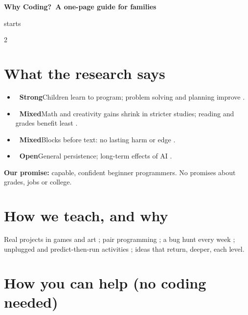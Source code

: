 \documentclass[level=1]{kidscode}
\newcommand{\evlabel}[3]{\textcolor{#1}{\textbf{#2\ #3}}}
\newcommand{\evS}{\evlabel{kcgreentext}{\faCheckCircle}{Strong}}
\newcommand{\evM}{\evlabel{kcorangetext}{\faAdjust}{Mixed}}
\newcommand{\evO}{\evlabel{kcpurpletext}{\faQuestionCircle}{Open}}
\begin{document}
\thispagestyle{fancy}
%
{\fontsize{24}{28}\selectfont\bfseries Why Coding?\ \mdseries A one-page guide for families\par}
\vspace{0.1em}
{\color{kcgray}\CourseName{} \textperiodcentered{} \CourseShape{} \textperiodcentered{} \SessionLength{} \textperiodcentered{} starts \StartDate\par}

\begin{multicols}{2}
\raggedright\small

\section{What the research says}
\begin{itemize}
  \item \evS\enspace Children learn to program; problem solving and planning improve
    \parencite{scherer2019transfer,montuori2024ct}.
  \item \evM\enspace Math and creativity gains shrink in stricter studies; reading and grades
    benefit least \parencite{scherer2019transfer}.
  \item \evM\enspace Blocks before text: no lasting harm or edge \parencite{xu2019blocks}.
  \item \evO\enspace General persistence; long-term effects of AI \parencite{kazemitabaar2023codex}.
\end{itemize}
\textbf{Our promise:} capable, confident beginner programmers. No promises about grades, jobs or college.

\section{How we teach, and why}
Real projects in games and art \parencite{resnick2009scratch}; pair programming
\parencite{umapathy2017pair}; a bug hunt every week \parencite{michaeli2019debugging}; unplugged
and predict-then-run activities \parencite{sentance2019primm}; ideas that return, deeper, each level.

\section{How you can help (no coding needed)}
\begin{itemize}
  \HelpItems
\end{itemize}


\end{multicols}
\end{document}
